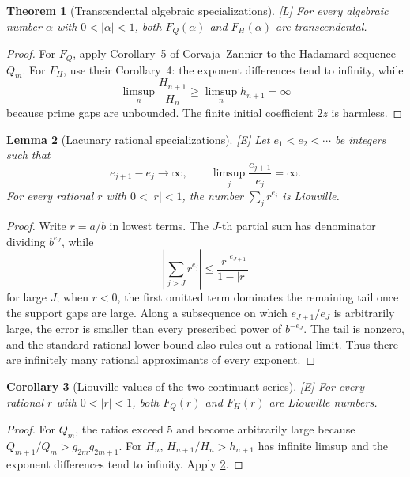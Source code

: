 \documentclass[11pt]{article}
\newtheorem{theorem}{Theorem}[section]
\newtheorem{lemma}[theorem]{Lemma}
\newtheorem{corollary}[theorem]{Corollary}
\theoremstyle{definition}
\theoremstyle{remark}
\newcommand{\status}[1]{\textnormal{\textcolor{accent}{\footnotesize[#1]}}}
\begin{document}
\begin{theorem}[Transcendental algebraic specializations]\label{thm:FQ-FH-algebraic}
\status{L}
For every algebraic number $\alpha$ with $0<|\alpha|<1$, both
$F_Q(\alpha)$ and $F_H(\alpha)$ are transcendental.
\end{theorem}

\begin{proof}
For $F_Q$, apply Corollary~5 of Corvaja--Zannier \cite{CorvajaZannier} to the Hadamard
sequence $Q_m$.  For $F_H$, use their Corollary~4: the exponent differences tend to
infinity, while
\[
 \limsup_n\frac{H_{n+1}}{H_n}
 \ge\limsup_n h_{n+1}=\infty
\]
because prime gaps are unbounded.  The finite initial coefficient $2z$ is harmless.
\end{proof}

\begin{lemma}[Lacunary rational specializations]\label{lem:Liouville-lacunary}
\status{E}
Let $e_1<e_2<\cdots$ be integers such that
\[
 e_{j+1}-e_j\to\infty,\qquad
 \limsup_j\frac{e_{j+1}}{e_j}=\infty.
\]
For every rational $r$ with $0<|r|<1$, the number $\sum_jr^{e_j}$ is Liouville.
\end{lemma}

\begin{proof}
Write $r=a/b$ in lowest terms.  The $J$-th partial sum has denominator dividing
$b^{e_J}$, while
\[
 \left|\sum_{j>J}r^{e_j}\right|
 \le\frac{|r|^{e_{J+1}}}{1-|r|}
\]
for large $J$; when $r<0$, the first omitted term dominates the remaining tail once the
support gaps are large.  Along a subsequence on which $e_{J+1}/e_J$ is arbitrarily large,
the error is smaller than every prescribed power of $b^{-e_J}$.  The tail is nonzero, and
the standard rational lower bound also rules out a rational limit.  Thus there are
infinitely many rational approximants of every exponent.
\end{proof}

\begin{corollary}[Liouville values of the two continuant series]
\label{cor:FQ-FH-Liouville}
\status{E}
For every rational $r$ with $0<|r|<1$, both $F_Q(r)$ and $F_H(r)$ are Liouville
numbers.
\end{corollary}

\begin{proof}
For $Q_m$, the ratios exceed $5$ and become arbitrarily large because
$Q_{m+1}/Q_m>g_{2m}g_{2m+1}$.  For $H_n$,
$H_{n+1}/H_n>h_{n+1}$ has infinite limsup and the exponent differences tend to
infinity.  Apply \cref{lem:Liouville-lacunary}.
\end{proof}
\end{document}
